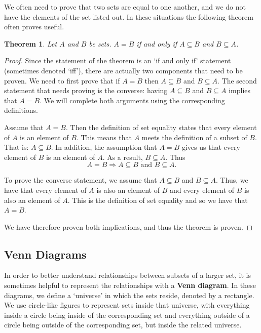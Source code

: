 \documentclass[
]{book}
\newtheorem{theorem}{Theorem}[chapter]
\theoremstyle{definition}
\theoremstyle{definition}
\theoremstyle{definition}
\theoremstyle{definition}
\theoremstyle{remark}
\begin{document}
We often need to prove that two sets are equal to one another, and we do not have the elements of the set listed out. In these situations the following theorem often proves useful.

\begin{theorem}
\protect\hypertarget{thm:set-equality}{}\label{thm:set-equality}Let \(A\) and \(B\) be sets. \(A=B\) if and only if \(A \subseteq B\) and \(B \subseteq A\).
\end{theorem}

\begin{proof}
Since the statement of the theorem is an `if and only if' statement (sometimes denoted `iff'), there are actually two components that need to be proven. We need to first prove that if \(A=B\) then \(A \subseteq B\) and \(B \subseteq A\). The second statement that needs proving is the converse: having \(A \subseteq B\) and \(B \subseteq A\) implies that \(A=B\). We will complete both arguments using the corresponding definitions.

Assume that \(A=B\). Then the definition of set equality states that every element of \(A\) is an element of \(B\). This means that \(A\) meets the definition of a subset of \(B\). That is: \(A\subseteq B\). In addition, the assumption that \(A=B\) gives us that every element of \(B\) is an element of \(A\). As a result, \(B\subseteq A\). Thus \[A=B \Rightarrow A\subseteq B \mbox{ and } B\subseteq A.\]

To prove the converse statement, we assume that \(A \subseteq B\) and \(B \subseteq A\). Thus, we have that every element of \(A\) is also an element of \(B\) and every element of \(B\) is also an element of \(A\). This is the definition of set equality and so we have that \(A=B\).

We have therefore proven both implications, and thus the theorem is proven.
\end{proof}

\hypertarget{venn-diagrams}{%
\subsection{Venn Diagrams}\label{venn-diagrams}}

In order to better understand relationships between subsets of a larger set, it is sometimes helpful to represent the relationships with a \textbf{Venn diagram}. In these diagrams, we define a `universe' in which the sets reside, denoted by a rectangle. We use circle-like figures to represent sets inside that universe, with everything inside a circle being inside of the corresponding set and everything outside of a circle being outside of the corresponding set, but inside the related universe.
\end{document}
